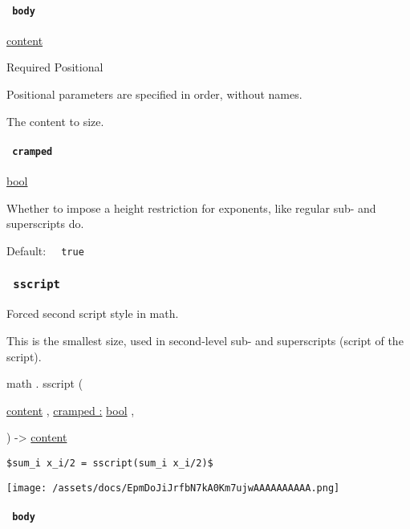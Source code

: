 \paragraph{\texorpdfstring{\texttt{\ body\ }}{ body }}\label{functions-script-body}

\href{/docs/reference/foundations/content/}{content}

{Required} {{ Positional }}

\label{functions-script-body-positional-tooltip}
Positional parameters are specified in order, without names.

The content to size.

\paragraph{\texorpdfstring{\texttt{\ cramped\ }}{ cramped }}\label{functions-script-cramped}

\href{/docs/reference/foundations/bool/}{bool}

Whether to impose a height restriction for exponents, like regular sub-
and superscripts do.

Default: \texttt{\ }{\texttt{\ true\ }}\texttt{\ }

\subsubsection{\texorpdfstring{\texttt{\ sscript\ }}{ sscript }}\label{functions-sscript}

Forced second script style in math.

This is the smallest size, used in second-level sub- and superscripts
(script of the script).

math { . } { sscript } (

{ \href{/docs/reference/foundations/content/}{content} , } {
\hyperref[functions-sscript-parameters-cramped]{cramped :}
\href{/docs/reference/foundations/bool/}{bool} , }

) -\textgreater{} \href{/docs/reference/foundations/content/}{content}

\begin{verbatim}
$sum_i x_i/2 = sscript(sum_i x_i/2)$
\end{verbatim}

\texttt{[image: /assets/docs/EpmDoJiJrfbN7kA0Km7ujwAAAAAAAAAA.png]}

\paragraph{\texorpdfstring{\texttt{\ body\ }}{ body }}\label{functions-sscript-body}

